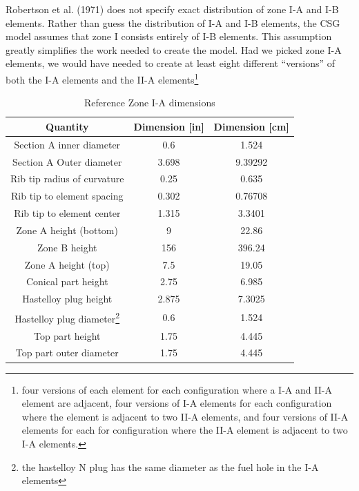 Robertson et al. (1971) does not specify exact distribution of zone I-A and I-B
elements. Rather than guess the distribution of I-A and I-B elements, the CSG
model assumes that zone I consists entirely of I-B elements. This assumption
greatly simplifies the work needed to create the model. Had we picked zone I-A
elements, we would have needed to create at least eight different ``versions''
of both the I-A elements and the II-A elements\footnote{four versions of each
element for each configuration where a I-A and II-A element are adjacent,
four versions of I-A elements for each configuration where the element is
adjacent to two II-A elements, and four versions of II-A elements for each for
configuration where the II-A element is adjacent to two I-A elements.}

\begin{table}[htpb]
    \centering
    \caption{Reference Zone I-A dimensions}
    \label{tab:zone-ia-ref-specs}
    \begin{tabulary}{\linewidth}{|C|C|C|}
    \hline
    Quantity & Dimension [in] & Dimension [\unit{\centi\metre}]\\
    \hline
    Section A inner diameter & 0.6 & 1.524 \\
    \hline
    Section A Outer diameter & 3.698 & 9.39292 \\
    \hline
    Rib tip radius of curvature & 0.25 & 0.635 \\
    \hline
    Rib tip to element spacing & 0.302 & 0.76708 \\
    \hline
    Rib tip to element center & 1.315 & 3.3401 \\
    \hline
    Zone A height (bottom) & 9 & 22.86\\
    \hline
    Zone B height & 156 & 396.24 \\
    \hline
    Zone A height (top) & 7.5 & 19.05 \\
    \hline
    Conical part height & 2.75 & 6.985 \\
    \hline
    Hastelloy plug height & 2.875 & 7.3025 \\
    \hline
    Hastelloy plug diameter\footnote{the hastelloy N plug has the same diameter as the fuel hole in the I-A elements} & 0.6 & 1.524 \\
    \hline
    Top part height & 1.75 & 4.445 \\
    \hline
    Top part outer diameter & 1.75 & 4.445 \\
    \hline
    \end{tabulary}
\end{table}


